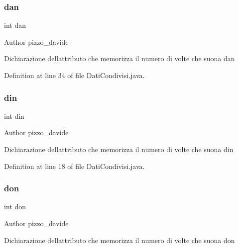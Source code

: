 \subsubsection{\texorpdfstring{dan}{dan}}
{\footnotesize\ttfamily int dan\hspace{0.3cm}{\ttfamily [private]}}

\begin{DoxyAuthor}{Author}
pizzo\+\_\+davide
\end{DoxyAuthor}
Dichiarazione dell\textquotesingle{}attributo che memorizza il numero di volte che suona \textquotesingle{}dan\textquotesingle{} 

Definition at line 34 of file Dati\+Condivisi.\+java.

\mbox{\label{classcampane_1_1_dati_condivisi_a7f432241955f773b6cc92136a349bf87}} 
\subsubsection{\texorpdfstring{din}{din}}
{\footnotesize\ttfamily int din\hspace{0.3cm}{\ttfamily [private]}}

\begin{DoxyAuthor}{Author}
pizzo\+\_\+davide
\end{DoxyAuthor}
Dichiarazione dell\textquotesingle{}attributo che memorizza il numero di volte che suona \textquotesingle{}din\textquotesingle{} 

Definition at line 18 of file Dati\+Condivisi.\+java.

\mbox{\label{classcampane_1_1_dati_condivisi_ad91fff4fe648ed3a29461c07bef850da}} 
\subsubsection{\texorpdfstring{don}{don}}
{\footnotesize\ttfamily int don\hspace{0.3cm}{\ttfamily [private]}}

\begin{DoxyAuthor}{Author}
pizzo\+\_\+davide
\end{DoxyAuthor}
Dichiarazione dell\textquotesingle{}attributo che memorizza il numero di volte che suona \textquotesingle{}don\textquotesingle{} 

